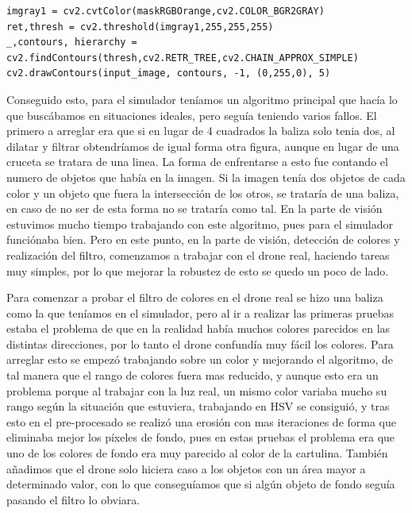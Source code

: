 \begin{verbatim}
imgray1 = cv2.cvtColor(maskRGBOrange,cv2.COLOR_BGR2GRAY)
ret,thresh = cv2.threshold(imgray1,255,255,255)
_,contours, hierarchy = cv2.findContours(thresh,cv2.RETR_TREE,cv2.CHAIN_APPROX_SIMPLE)
cv2.drawContours(input_image, contours, -1, (0,255,0), 5)
\end{verbatim}

\hspace{1cm}Conseguido esto, para el simulador ten\'iamos un algoritmo principal que hac\'ia lo que busc\'abamos en situaciones ideales, pero segu\'ia teniendo varios fallos.
\hspace{1cm} El primero a arreglar era que si en lugar de 4 cuadrados la baliza solo tenia dos, al dilatar y filtrar obtendr\'iamos de igual forma otra figura, aunque en lugar de una cruceta se tratara de una linea. La forma de enfrentarse a esto fue contando el numero de objetos que hab\'ia en la imagen. Si la imagen ten\'ia dos objetos de cada color y un objeto que fuera la intersecci\'on de los otros, se tratar\'ia de una baliza, en caso de no ser de esta forma no se tratar\'ia como tal. En la parte de visi\'on estuvimos mucho tiempo trabajando con este algoritmo, pues para el simulador funci\'onaba bien. Pero en este punto, en la parte de visi\'on, detecci\'on de colores y realizaci\'on del filtro, comenzamos a trabajar con el drone real, haciendo tareas muy simples, por lo que mejorar la robustez de esto se quedo un poco de lado. 

\hspace{1cm} Para comenzar a probar el filtro de colores en el drone real se hizo una baliza como la que ten\'iamos en el simulador, pero al ir a realizar las primeras pruebas estaba el problema de que en la realidad hab\'ia muchos colores parecidos en las distintas direcciones, por lo tanto el drone confund\'ia muy f\'acil los colores. Para arreglar esto se empez\'o trabajando sobre un color y mejorando el algoritmo, de tal manera que el rango de colores fuera mas reducido, y aunque esto era un problema porque al trabajar con la luz real, un mismo color variaba mucho su rango seg\'un  la situaci\'on que estuviera, trabajando en HSV se consigui\'o, y tras esto en el pre-procesado se realiz\'o una erosi\'on con mas iteraciones de forma que eliminaba mejor los p\'ixeles de fondo, pues en estas pruebas el problema era que uno de los colores de fondo era muy parecido al color de la cartulina. Tambi\'en añadimos que el drone solo hiciera caso a los objetos con un \'area mayor a determinado valor, con lo que consegu\'iamos que si alg\'un objeto de fondo segu\'ia pasando el filtro lo obviara.

